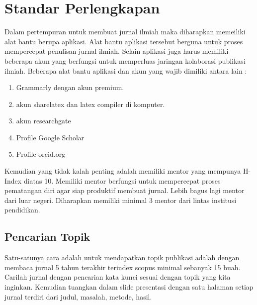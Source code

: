 \chapter{Standar Perlengkapan}

Dalam pertempuran untuk membuat jurnal ilmiah maka diharapkan memeiliki alat bantu berupa aplikasi. Alat bantu aplikasi tersebut berguna untuk proses mempercepat penulisan jurnal ilmiah. Selain aplikasi juga harus memiliki beberapa akun yang berfungsi untuk memperluas jaringan kolaborasi publikasi ilmiah. Beberapa alat bantu aplikasi dan akun yang wajib dimiliki antara lain :
\begin{enumerate}
\item Grammarly dengan akun premium.
\item akun sharelatex dan latex compiler di komputer.
\item akun researchgate
\item Profile Google Scholar
\item Profile orcid.org
\end{enumerate}
Kemudian yang tidak kalah penting adalah memiliki mentor yang mempunya H-Index diatas 10. Memiliki mentor berfungsi untuk mempercepat proses pematangan diri agar siap produktif membuat jurnal. Lebih bagus lagi mentor dari luar negeri. Diharapkan memiliki minimal 3 mentor dari lintas institusi pendidikan.

\section{Pencarian Topik}
Satu-satunya cara adalah untuk mendapatkan topik publikasi adalah dengan membaca jurnal 5 tahun terakhir terindex scopus minimal sebanyak 15 buah. Carilah jurnal dengan pencarian  kata kunci sesuai dengan topik yang kita inginkan. Kemudian tuangkan dalam slide presentasi dengan satu halaman setiap jurnal terdiri dari judul, masalah, metode, hasil.
